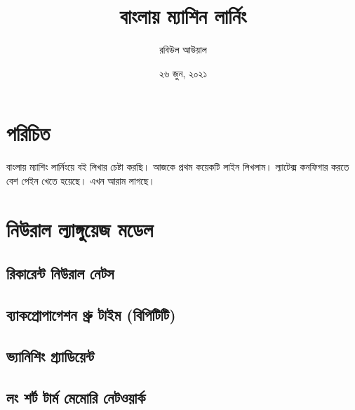 \documentclass{article}
\title{বাংলায় ম্যাশিন লার্নিং }
\author{রবিউল আউয়াল}
\date{২৬ জুন, ২০২১}
\begin{document}
\maketitle
\section{পরিচিত }
বাংলায় ম্যাশিং লার্নিংয়ে  বই লিখার চেষ্টা করছি। আজকে প্রথম কয়েকটি লাইন লিখলাম। ল্যাটেক্স কনফিগার করতে বেশ পেইন খেতে হয়েছে। এখন আরাম লাগছে।
\section{নিউরাল ল্যাঙ্গুয়েজ মডেল}
\subsection{রিকারেন্ট নিউরাল নেটস}
\subsection{ব্যাকপ্রোপাগেশন থ্রু টাইম (বিপিটিটি) }
\subsection{ভ্যানিশিং গ্র্যাডিয়েন্ট}
\subsection{লং শর্ট টার্ম মেমোরি নেটওয়ার্ক}
\end{document}
